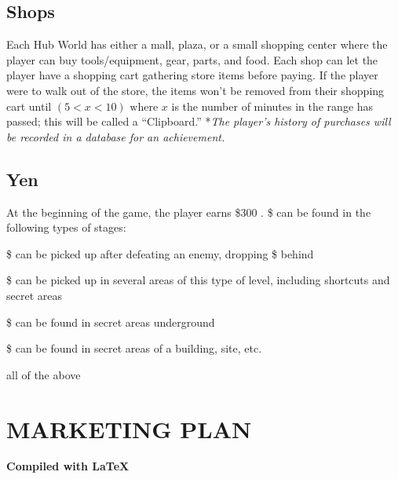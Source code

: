 \documentclass[11pt]{article}
\begin{document}
	\subsection*{Shops}
	Each Hub World has either a mall, plaza, or a small shopping center where the player can buy tools/equipment, gear, parts, and food. \newline \newline
	Each shop can let the player have a shopping cart gathering store items before paying. If the player were to walk out of the store, the items won't be removed from their shopping cart until $(5 < x < 10) \textrm{ where } x$ is the number of minutes in the range has passed; this will be called a ``Clipboard.'' \newline \newline
	*\textit{The player's history of purchases will be recorded in a database for an achievement.}
	\subsection*{Yen}
	At the beginning of the game, the player earns \$300 \iffalse 34,000 \$ ($\approx$ \$302) \fi. \$ can be found in the following types of stages:
	\begin{description}[align=right,labelwidth=3cm,noitemsep]
		\item [Fight Level:] \$ can be picked up after defeating an enemy, dropping \$ behind
		\item [Platform Level:] \$ can be picked up in several areas of this type of level, including shortcuts and secret areas
		\item [Dig Level:] \$ can be found in secret areas underground
		\item [Stealth Level:] \$ can be found in secret areas of a building, site, etc.
		\item [Combo Level:] all of the above
	\end{description}
	\section*{MARKETING PLAN}
	
	\vfill
	\begin{center}
		\textbf{\Huge Compiled with \LaTeX}
	\end{center}
\end{document}
